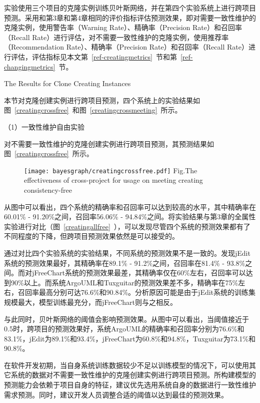 实验使用三个项目的克隆实例训练贝叶斯网络，并在第四个实验系统上进行跨项目预测。采用和第3章和第4章相同的评价指标评估预测效果，即对需要一致性维护的克隆实例，使用警告率（Warning Rate）、精确率（Precision Rate）和召回率（Recall Rate）进行评估，对不需要一致性维护的克隆实例，使用推荐率（Recommendation Rate）、精确率（Precision Rate）和召回率（Recall Rate）进行评估，评估指标见本文第~\ref{ref-creatingmetrics}~节和第~\ref{ref-changingmetrics}~节。

{The Results for Clone Creating Instances}

本节对克隆创建实例进行跨项目预测，四个系统上的实验结果如图~\ref{creatingcrossfree}~和图~\ref{creatingcrossmeeting}~所示。


（1）一致性维护自由实验

对不需要一致性维护的克隆创建实例进行跨项目预测，其预测结果如图~\ref{creatingcrossfree}~所示。

\begin{figure}[h]
\centering
\texttt{[image: bayesgraph/creatingcrossfree.pdf]}
{Fig.$\!$}{The effectiveness of cross-project for usage on meeting creating consistency-free}
\vspace{-1em}
\end{figure}

从图中可以看出，四个系统的精确率和召回率可以达到较高的水平，其中精确率在60.01\% - 91.20\%之间，召回率56.06\% - 94.84\%之间。将实验结果与第3章的全属性实验进行对比（图~\ref{creatingallfree}~），可以发现尽管四个系统的预测效果都有了不同程度的下降，但跨项目预测效果依然是可以接受的。

通过对比四个实验系统的实验结果，不同系统的预测效果不是一致的。发现jEdit系统的预测效果最好，其精确率在89.1\% - 91.2\%之间，召回率在81.4\% - 93.8\%之间。而对jFreeChart系统的预测效果最差，其精确率仅在60\%左右，召回率可以达到90\%以上。而系统ArgoUML和Tuxguitar的预测效果差不多，精确率在75\%左右，召回率最高分别可达76.6\%和90.84\%。分析原因可能是由于jEdit系统的训练集规模最大，模型训练最充分，而jFreeChart则与之相反。

与此同时，贝叶斯网络的阈值会影响预测效果。从图中可以看出，当阈值接近于0.5时，跨项目的预测效果好，系统ArgoUML的精确率和召回率分别为76.6\%和83.1\%，jEdit为89.1\%和93.4\%，jFreeChart为60.8\%和94.8\%，Tuxguitar为73.1\%和90.8\%。

在软件开发初期，当自身系统训练数据较少不足以训练模型的情况下，可以使用其它系统的数据对不需要一致性维护的克隆创建实例进行跨项目预测。所构建模型的预测能力会依赖于项目自身的特征，建议优先选用系统自身的数据进行一致性维护需求预测。同时，建议开发人员调整合适的阈值以达到最佳的预测效果。

